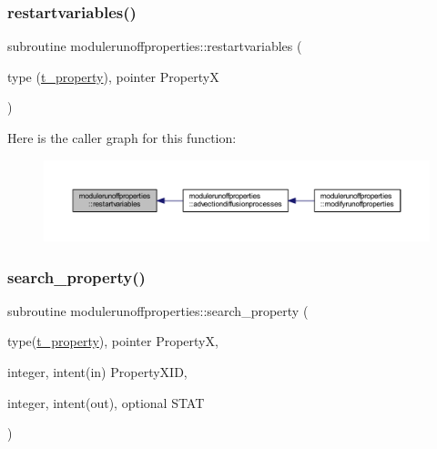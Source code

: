 \subsubsection{\texorpdfstring{restartvariables()}{restartvariables()}}
{\footnotesize\ttfamily subroutine modulerunoffproperties\+::restartvariables (\begin{DoxyParamCaption}\item[{type (\mbox{\hyperlink{structmodulerunoffproperties_1_1t__property}{t\+\_\+property}}), pointer}]{PropertyX }\end{DoxyParamCaption})\hspace{0.3cm}{\ttfamily [private]}}

Here is the caller graph for this function\+:\nopagebreak
\begin{figure}[H]
\begin{center}
\leavevmode
\includegraphics[width=350pt]{namespacemodulerunoffproperties_a0582858e9347f67d92588e44257918a3_icgraph}
\end{center}
\end{figure}
\mbox{\label{namespacemodulerunoffproperties_a13bbe5dac13800aec15511ca3b8b2a66}} 
\subsubsection{\texorpdfstring{search\+\_\+property()}{search\_property()}}
{\footnotesize\ttfamily subroutine modulerunoffproperties\+::search\+\_\+property (\begin{DoxyParamCaption}\item[{type(\mbox{\hyperlink{structmodulerunoffproperties_1_1t__property}{t\+\_\+property}}), pointer}]{PropertyX,  }\item[{integer, intent(in)}]{Property\+X\+ID,  }\item[{integer, intent(out), optional}]{S\+T\+AT }\end{DoxyParamCaption})\hspace{0.3cm}{\ttfamily [private]}}

